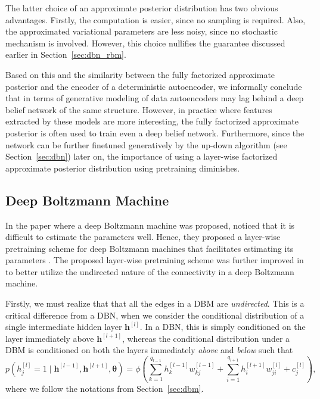 \documentclass[dissertation,nocontribution,draft*]{aaltoseries}
\newcommand{\qlay}[1]{\left[#1\right]}
\newcommand{\vect}[1]{\mathbf{#1}}
\newcommand{\vects}[1]{\boldsymbol{#1}}
\newcommand{\vh}[0]{\vect{h}}
\newcommand{\TT}[0]{{\vects{\theta}}}
\begin{document}
The latter choice of an approximate posterior distribution
has two obvious advantages. Firstly, the computation is
easier, since no sampling is required. Also, the
approximated variational parameters are less noisy, since no
stochastic mechanism is involved. However, this choice
nullifies the guarantee discussed earlier in
Section~\ref{sec:dbn_rbm}.

Based on this and the similarity between the
fully factorized approximate posterior and the encoder of a
deterministic autoencoder, we informally conclude that in
terms of generative modeling of data autoencoders may lag
behind a deep belief network of the same structure. However,
in practice where features extracted by these models are
more interesting, the fully factorized
approximate posterior is often used to train even a deep belief network.
Furthermore, since the network can be further finetuned
generatively by the up-down algorithm (see
Section~\ref{sec:dbn}) later on, the importance of using a
layer-wise factorized approximate posterior distribution
using pretraining diminishes.



\subsection{Deep Boltzmann Machine}
\label{sec:dbm_pre}

In the paper where a deep
Boltzmann machine was proposed, \citet{Salakhutdinov2009a} noticed that it is difficult
to estimate the parameters well. Hence, they proposed a
layer-wise pretraining scheme for deep Boltzmann machines
that facilitates estimating its parameters
\citep{Salakhutdinov2012nc}. The proposed layer-wise
pretraining scheme was further improved in
\citep{Salakhutdinov2012} to better utilize the undirected
nature of the connectivity in a deep Boltzmann machine.

Firstly, we must realize that that all the edges in a DBM are
\textit{undirected}. This is a critical difference from a
DBN, when we consider the conditional distribution of a
single intermediate hidden layer $\vh^{\qlay{l}}$. In a DBN, this
is simply conditioned on the layer immediately above
$\vh^{\qlay{l+1}}$, whereas the conditional distribution under a
DBM is conditioned on both the layers immediately
\textit{above} and \textit{below} such that
\[
p(h^{\qlay{l}}_j = 1 \mid \vh^{\qlay{l-1}}, \vh^{\qlay{l+1}}, \TT) = \phi\left(
\sum_{k=1}^{q_{l-1}} h^{\qlay{l-1}}_k w_{kj}^{\qlay{l-1}} +
\sum_{i=1}^{q_{l+1}} h^{\qlay{l+1}}_i w_{ji}^{\qlay{l}} +
c_j^{\qlay{l}}
\right),
\]
where we follow the notations from Section~\ref{sec:dbm}.
\end{document}
